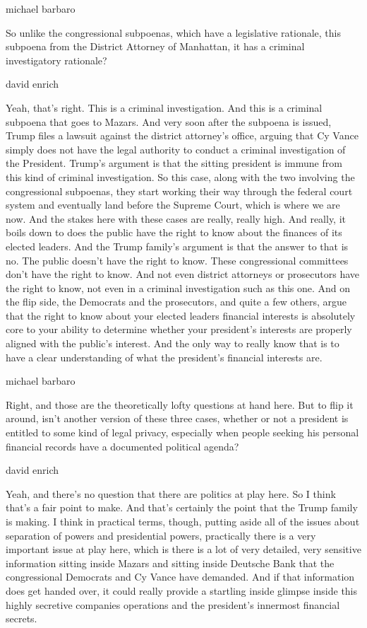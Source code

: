 michael barbaro

So unlike the congressional subpoenas, which have a legislative
rationale, this subpoena from the District Attorney of Manhattan, it has
a criminal investigatory rationale?

david enrich

Yeah, that's right. This is a criminal investigation. And this is a
criminal subpoena that goes to Mazars. And very soon after the subpoena
is issued, Trump files a lawsuit against the district attorney's office,
arguing that Cy Vance simply does not have the legal authority to
conduct a criminal investigation of the President. Trump's argument is
that the sitting president is immune from this kind of criminal
investigation. So this case, along with the two involving the
congressional subpoenas, they start working their way through the
federal court system and eventually land before the Supreme Court, which
is where we are now. And the stakes here with these cases are really,
really high. And really, it boils down to does the public have the right
to know about the finances of its elected leaders. And the Trump
family's argument is that the answer to that is no. The public doesn't
have the right to know. These congressional committees don't have the
right to know. And not even district attorneys or prosecutors have the
right to know, not even in a criminal investigation such as this one.
And on the flip side, the Democrats and the prosecutors, and quite a few
others, argue that the right to know about your elected leaders
financial interests is absolutely core to your ability to determine
whether your president's interests are properly aligned with the
public's interest. And the only way to really know that is to have a
clear understanding of what the president's financial interests are.

michael barbaro

Right, and those are the theoretically lofty questions at hand here. But
to flip it around, isn't another version of these three cases, whether
or not a president is entitled to some kind of legal privacy, especially
when people seeking his personal financial records have a documented
political agenda?

david enrich

Yeah, and there's no question that there are politics at play here. So I
think that's a fair point to make. And that's certainly the point that
the Trump family is making. I think in practical terms, though, putting
aside all of the issues about separation of powers and presidential
powers, practically there is a very important issue at play here, which
is there is a lot of very detailed, very sensitive information sitting
inside Mazars and sitting inside Deutsche Bank that the congressional
Democrats and Cy Vance have demanded. And if that information does get
handed over, it could really provide a startling inside glimpse inside
this highly secretive companies operations and the president's innermost
financial secrets.


